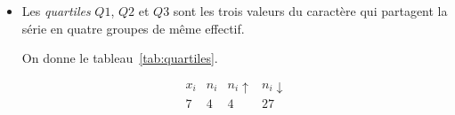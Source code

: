 \begin{defi}
\begin{itemize}
\begin{ex}
\begin{itemize}
                                                            La moyenne est donc : 
                                                            $\displaystyle{
                                                                  \frac{  3 \cdot 14 + 2 \cdot 13 + 1 \cdot 14
                                                                        + \cdots
                                                                        + 4 \cdot 15 + 1 \cdot 08 }
                                                                       {3 + 2 + 1 + \cdots + 4 + 1}
                                                            }$
                                                            qui est \'egale \`a $13,57$.
                                                \end{itemize}
                                          \end{ex}
                                    \item Les \emph{quartiles} $Q1$, $Q2$ et $Q3$ sont les trois valeurs 
                                          du caract\`ere qui partagent la s\'erie en quatre groupes de m\^eme effectif.
                                          \begin{ex}
                                                On donne le tableau~\ref{tab:quartiles}.
                                                \begin{table}[H]
                                                \[
                                                      \begin{array}{|c|c|c|c|}
                                                      \hline
                                                      x_i      & n_i      & n_i \uparrow & n_i \downarrow \\
                                                      \hline
                                                      7        & 4        & 4            & 27             \\

\end{array}\]
\end{table}
\end{ex}
\end{itemize}
\end{defi}
